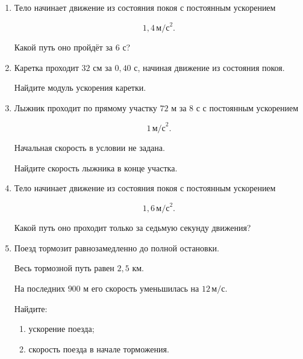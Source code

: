 \documentclass[a4paper,12pt]{article}
\newcommand{\ms}{\,\text{м/с}}
\newcommand{\mss}{\,\text{м/с}^2}
\begin{document}
\begin{enumerate}

  \item
  Тело начинает движение из состояния покоя
  с постоянным ускорением

  \[
  1{,}4\mss.
  \]

  Какой путь оно пройдёт за $6$ с?

  \vspace{8mm}

  \item
  Каретка проходит $32$ см за $0{,}40$ с,
  начиная движение из состояния покоя.

  Найдите модуль ускорения каретки.

  \vspace{8mm}

  \item
  Лыжник проходит по прямому участку $72$ м
  за $8$ с с постоянным ускорением

  \[
  1\mss.
  \]

  Начальная скорость в условии не задана.

  Найдите скорость лыжника в конце участка.

  \vspace{8mm}

  \item
  Тело начинает движение из состояния покоя
  с постоянным ускорением

  \[
  1{,}6\mss.
  \]

  Какой путь оно проходит
  только за седьмую секунду движения?

  \vspace{8mm}

  \item
  Поезд тормозит равнозамедленно
  до полной остановки.

  Весь тормозной путь равен $2{,}5$ км.

  На последних $900$ м
  его скорость уменьшилась на $12\ms$.

  Найдите:

  \begin{enumerate}[label=\alph*)]
    \item ускорение поезда;
    \item скорость поезда в начале торможения.
  \end{enumerate}

\end{enumerate}

\end{document}

